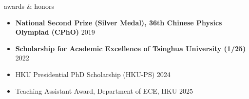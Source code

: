 \documentclass{resume}
\begin{document}
\begin{ResumeSection}{awards \& honors}
\vspace{3pt}
    \begin{itemize}
        \item \textbf{National Second Prize (Silver Medal), 36th Chinese Physics Olympiad (CPhO)} \hfill{2019}
    \end{itemize}
    \begin{itemize}
        \item \textbf{Scholarship for Academic Excellence of Tsinghua University (1/25)} \hfill{2022}
    \end{itemize}
    \begin{itemize}
        \item HKU Presidential PhD Scholarship (HKU-PS) \hfill{2024}
    \end{itemize}
    \begin{itemize}
        \item Teaching Assistant Award, Department of ECE, HKU \hfill{2025}
    \end{itemize}
\end{ResumeSection}
\end{document}

